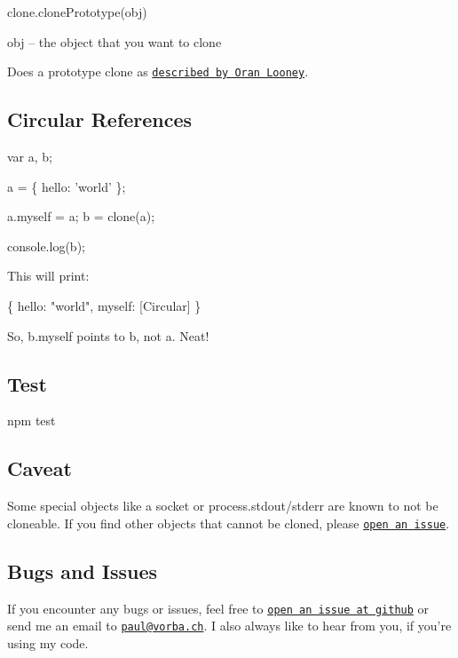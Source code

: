 {\ttfamily clone.\+clone\+Prototype(obj)}


\begin{DoxyItemize}
\item {\ttfamily obj} -- the object that you want to clone
\end{DoxyItemize}

Does a prototype clone as \href{http://oranlooney.com/functional-javascript/}{\tt described by Oran Looney}.

\subsection*{Circular References}


\begin{DoxyCode}
var a, b;

a = \{ hello: 'world' \};

a.myself = a;
b = clone(a);

console.log(b);
\end{DoxyCode}


This will print\+:


\begin{DoxyCode}
\{ hello: "world", myself: [Circular] \}
\end{DoxyCode}


So, {\ttfamily b.\+myself} points to {\ttfamily b}, not {\ttfamily a}. Neat!

\subsection*{Test}

\begin{DoxyVerb}npm test
\end{DoxyVerb}


\subsection*{Caveat}

Some special objects like a socket or {\ttfamily process.\+stdout}/{\ttfamily stderr} are known to not be cloneable. If you find other objects that cannot be cloned, please \href{https://github.com/pvorb/node-clone/issues/new}{\tt open an issue}.

\subsection*{Bugs and Issues}

If you encounter any bugs or issues, feel free to \href{https://github.com/pvorb/node-clone/issues}{\tt open an issue at github} or send me an email to \href{mailto:paul@vorba.ch}{\tt paul@vorba.\+ch}. I also always like to hear from you, if you’re using my code.

